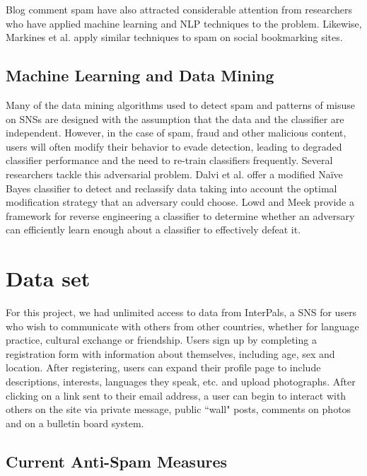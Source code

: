 \documentclass[preprint]{acm_proc_article-sp}
\begin{document}
Blog comment spam have also attracted considerable attention from researchers who 
have applied machine learning \cite{kolari, nag} and NLP \cite{mishne} techniques to the 
problem. Likewise, Markines et al. \cite{markines} apply similar techniques to spam on social bookmarking sites.

\subsection{Machine Learning and Data Mining}

Many of the data mining algorithms used to detect spam and patterns of misuse 
on SNSs are designed with the assumption that the data and the classifier are 
independent. However, in the case of spam, fraud and other malicious content, 
users will often modify their behavior to evade detection, leading to degraded 
classifier performance and the need to re-train classifiers frequently. Several 
researchers tackle this adversarial problem. Dalvi et al. \cite{dalvi} offer a 
modified Na\"ive Bayes classifier to detect and reclassify data taking into account 
the optimal modification strategy that an adversary could choose. Lowd and Meek \cite{lowd} 
provide a framework for reverse engineering a classifier to determine whether 
an adversary can efficiently learn enough about a classifier to effectively defeat it.

\section{Data set}

For this project, we had unlimited access to data from InterPals, a SNS for users who wish to communicate with others from other countries, whether for language practice, cultural exchange or friendship. Users sign up by completing a registration form with information about themselves, including age, sex and location. After registering, users can expand their profile page to include descriptions, interests, languages they speak, etc. and upload photographs. After clicking on a link sent to their email address, a user can begin to interact with others on the site via private message, public ``wall" posts, comments on photos and on a bulletin board system.

\subsection{Current Anti-Spam Measures}
\end{document}
